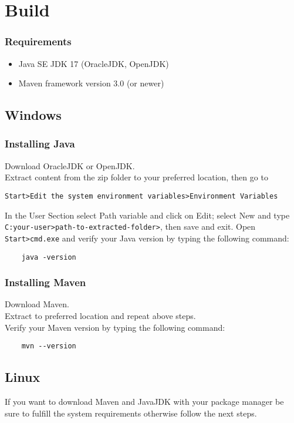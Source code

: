 \section{Build}

\subsubsection{Requirements}

\begin{itemize}
    \item Java SE JDK 17 (OracleJDK, OpenJDK)
    \item Maven framework version 3.0 (or newer)
\end{itemize}

\subsection{Windows}
\subsubsection{Installing Java}
Download OracleJDK or OpenJDK.\\
Extract content from the zip folder to your preferred location, then go to

\begin{verbatim}
Start>Edit the system environment variables>Environment Variables
\end{verbatim}
In the User Section select Path variable and click on Edit; select New and type \texttt{C:\Users\<your-user>\<path-to-extracted-folder>\bin}, then save and exit.
Open \texttt{Start>cmd.exe} and verify your Java version by typing the following command:
\begin{verbatim}
    java -version
\end{verbatim}

\subsubsection{Installing Maven}
Download Maven.\\
Extract to preferred location and repeat above steps.\\
Verify your Maven version by typing the following command:
\begin{verbatim}
    mvn --version
\end{verbatim}

\subsection{Linux}
If you want to download Maven and JavaJDK with your package manager be sure to fulfill the system requirements otherwise follow the next steps.
